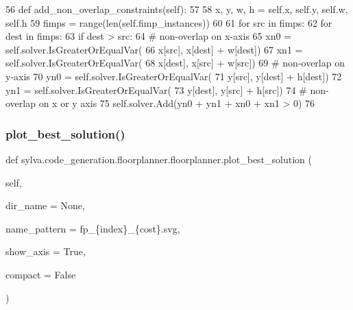 \begin{DoxyCode}
56   \textcolor{keyword}{def }add\_non\_overlap\_constraints(self):
57 
58     x, y, w, h = self.x, self.y, self.w, self.h
59     fimps = range(len(self.fimp\_instances))
60 
61     \textcolor{keywordflow}{for} src \textcolor{keywordflow}{in} fimps:
62       \textcolor{keywordflow}{for} dest \textcolor{keywordflow}{in} fimps:
63         \textcolor{keywordflow}{if} dest > src:
64           \textcolor{comment}{# non-overlap on x-axis}
65           xn0 = self.solver.IsGreaterOrEqualVar(
66             x[src], x[dest] + w[dest])
67           xn1 = self.solver.IsGreaterOrEqualVar(
68             x[dest], x[src] + w[src])
69           \textcolor{comment}{# non-overlap on y-axis}
70           yn0 = self.solver.IsGreaterOrEqualVar(
71             y[src], y[dest] + h[dest])
72           yn1 = self.solver.IsGreaterOrEqualVar(
73             y[dest], y[src] + h[src])
74           \textcolor{comment}{# non-overlap on x or y axis}
75           self.solver.Add(yn0 + yn1 + xn0 + xn1 > 0)
76 
\end{DoxyCode}
\mbox{\label{classsylva_1_1code__generation_1_1floorplanner_1_1floorplanner_a34a19dab41b1f0c2eb39a527b05e26e0}} 
\subsubsection{\texorpdfstring{plot\+\_\+best\+\_\+solution()}{plot\_best\_solution()}}
{\footnotesize\ttfamily def sylva.\+code\+\_\+generation.\+floorplanner.\+floorplanner.\+plot\+\_\+best\+\_\+solution (\begin{DoxyParamCaption}\item[{}]{self,  }\item[{}]{dir\+\_\+name = {\ttfamily None},  }\item[{}]{name\+\_\+pattern = {\ttfamily \textquotesingle{}fp\+\_\+\{index\}\+\_\+\{cost\}.svg\textquotesingle{}},  }\item[{}]{show\+\_\+axis = {\ttfamily True},  }\item[{}]{compact = {\ttfamily False} }\end{DoxyParamCaption})}



